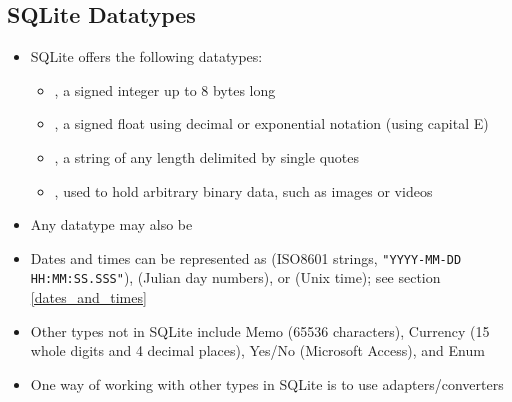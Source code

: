 \documentclass[a4paper]{article}
\begin{document}
\subsection{SQLite Datatypes}
\begin{itemize}
    \item SQLite offers the following datatypes:
    \begin{itemize}
        \item {}, a signed integer up to 8 bytes long
        \item {}, a signed float using decimal or exponential notation (using capital E)
        \item {}, a string of any length delimited by single quotes
        \item {}, used to hold arbitrary binary data, such as images or videos
    \end{itemize}
    \item Any datatype may also be 
    \item Dates and times can be represented as  (ISO8601 strings, \texttt{"YYYY-MM-DD HH:MM:SS.SSS"}),  (Julian day numbers), or  (Unix time); see section \ref{dates_and_times}
    \item Other types not in SQLite include Memo (65536 characters), Currency (15 whole digits and 4 decimal places), Yes/No (Microsoft Access), and Enum
    \item One way of working with other types in SQLite is to use adapters/converters

\end{itemize}
\end{document}
